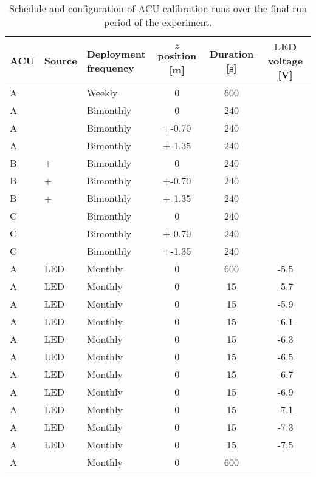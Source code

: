 \begin{table}[ht]
    \centering
    \footnotesize
    \begin{tabular}[t]{lllSSS}
        \toprule
        ACU & Source & \parbox[b]{2.1cm}{Deployment\\frequency} & {$z$ position [m]} &
        {Duration [s]} & {LED voltage [V]} \\
        \midrule
        A &  & Weekly & 0 & 600 & \\
        \midrule
        A &  & Bimonthly & 0 & 240 & \\
        A &  & Bimonthly & +-0.70 & 240 & \\
        A &  & Bimonthly & +-1.35 & 240 & \\
        B & \amc{} +  & Bimonthly & 0 & 240 & \\
        B & \amc{} +  & Bimonthly & +-0.70 & 240 & \\
        B & \amc{} +  & Bimonthly & +-1.35 & 240 & \\
        C &  & Bimonthly & 0 & 240 & \\
        C &  & Bimonthly & +-0.70 & 240 & \\
        C &  & Bimonthly & +-1.35 & 240 & \\
        \midrule
        A & LED & Monthly & 0 & 600 & -5.5 \\
        A & LED & Monthly & 0 & 15 & -5.7 \\
        A & LED & Monthly & 0 & 15 & -5.9 \\
        A & LED & Monthly & 0 & 15 & -6.1 \\
        A & LED & Monthly & 0 & 15 & -6.3 \\
        A & LED & Monthly & 0 & 15 & -6.5 \\
        A & LED & Monthly & 0 & 15 & -6.7 \\
        A & LED & Monthly & 0 & 15 & -6.9 \\
        A & LED & Monthly & 0 & 15 & -7.1 \\
        A & LED & Monthly & 0 & 15 & -7.3 \\
        A & LED & Monthly & 0 & 15 & -7.5 \\
        A &  & Monthly & 0 & 600 \\
        \bottomrule
    \end{tabular}
    \caption{
        Schedule and configuration of ACU calibration runs
        over the final run period of the experiment.
    }
    \label{tab:calib_sched}
\end{table}

